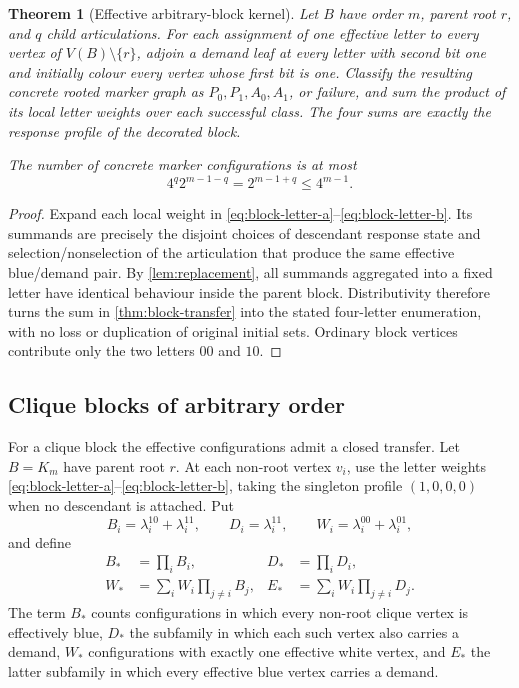 \documentclass[11pt,reqno]{amsart}
\newtheorem{theorem}{Theorem}[section]
\theoremstyle{definition}
\begin{document}
\begin{theorem}[Effective arbitrary-block kernel]\label{thm:effective-block}
Let $B$ have order $m$, parent root $r$, and $q$ child articulations.  For each
assignment of one effective letter to every vertex of $V(B)\setminus\{r\}$,
adjoin a demand leaf at every letter with second bit one and initially colour
every vertex whose first bit is one.  Classify the resulting concrete rooted
marker graph as $P_0,P_1,A_0,A_1$, or failure, and sum the product of its local
letter weights over each successful class.  The four sums are exactly the
response profile of the decorated block.

The number of concrete marker configurations is at most
\[
  4^q2^{m-1-q}=2^{m-1+q}\le4^{m-1}.
\]
\end{theorem}

\begin{proof}
Expand each local weight in \eqref{eq:block-letter-a}--\eqref{eq:block-letter-b}.
Its summands are precisely the disjoint choices of descendant response state
and selection/nonselection of the articulation that produce the same effective
blue/demand pair.  By \cref{lem:replacement}, all summands aggregated into a
fixed letter have identical behaviour inside the parent block.  Distributivity
therefore turns the sum in \cref{thm:block-transfer} into the stated four-letter
enumeration, with no loss or duplication of original initial sets.  Ordinary
block vertices contribute only the two letters $00$ and $10$.
\end{proof}

\subsection{Clique blocks of arbitrary order}\label{subsec:clique-transfer}

For a clique block the effective configurations admit a closed transfer.  Let
$B=K_m$ have parent root $r$.  At each non-root vertex $v_i$, use the letter
weights \eqref{eq:block-letter-a}--\eqref{eq:block-letter-b}, taking the
singleton profile $(1,0,0,0)$ when no descendant is attached.  Put
\[
  B_i=\lambda_i^{10}+\lambda_i^{11},\qquad
  D_i=\lambda_i^{11},\qquad
  W_i=\lambda_i^{00}+\lambda_i^{01},
\]
and define
\begin{align*}
  B_*&=\prod_i B_i,
  &D_*&=\prod_i D_i,\\
  W_*&=\sum_i W_i\prod_{j\ne i}B_j,
  &E_*&=\sum_i W_i\prod_{j\ne i}D_j.
\end{align*}
The term $B_*$ counts configurations in which every non-root clique vertex is
effectively blue, $D_*$ the subfamily in which each such vertex also carries
a demand, $W_*$ configurations with exactly one effective white vertex, and
$E_*$ the latter subfamily in which every effective blue vertex carries a
demand.
\end{document}
